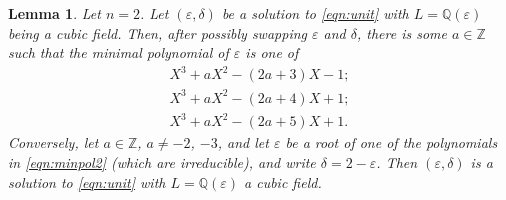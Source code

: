 \documentclass{amsart}
\newcommand{\Q}{\mathbb{Q}}
\newcommand{\Z}{\mathbb{Z}}
\newtheorem{lem}[thm]{Lemma}
\theoremstyle{definition}
\theoremstyle{remark}
\begin{document}
\begin{lem}\label{lem:minpol2}
	Let $n=2$. Let $(\varepsilon,\delta)$ be a solution
		to \eqref{eqn:unit} with $L=\Q(\varepsilon)$ being
		a cubic field. Then,
		after possibly swapping $\varepsilon$ and $\delta$,
		there is some $a \in \Z$
		such that the minimal polynomial
		of $\varepsilon$ is one of
		\begin{equation}\label{eqn:minpol2}
			\begin{split}
			X^3+aX^2-(2a+3)X-1; \\
			X^3+aX^2-(2a+4)X+1; \\
			X^3+aX^2-(2a+5)X+1.
			\end{split}
		\end{equation}
		Conversely, let $a \in \Z$, $a\neq -2$, $-3$, and let $\varepsilon$
		be a root of one of the polynomials in \eqref{eqn:minpol2} (which are irreducible),
		and write $\delta=2-\varepsilon$. Then $(\varepsilon,\delta)$
		is a solution to \eqref{eqn:unit} with $L=\Q(\varepsilon)$
		a cubic field.
	\end{lem}

\end{document}
